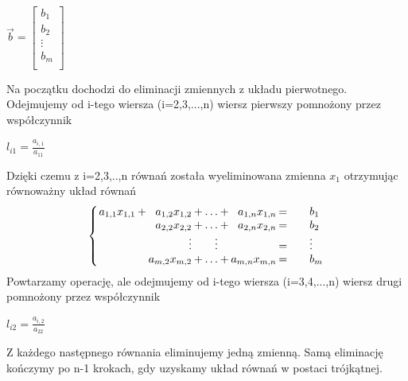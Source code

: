 \documentclass{article}
\begin{document}
\begin{center}
    \begin{math}
    \overrightarrow{b} =
    \left[
  \begin{matrix}
    b_{1}  \\
    b_{2}  \\
    \vdots   \\
    b_{m}  \\
  \end{matrix}
  \right]
    \end{math}
\end{center}
Na początku dochodzi do eliminacji zmiennych z układu pierwotnego. Odejmujemy od i-tego wiersza (i=2,3,...,n) wiersz
pierwszy pomnożony przez współczynnik
\begin{center}
    \begin{math}
        l_{i1} = \frac{a_{i,1}}{a_{11}}
    \end{math}
\end{center}
Dzięki czemu z  i=2,3,..,n równań została wyeliminowana zmienna \begin{math}x_{1} \end{math} otrzymując równoważny układ równań
\[
\setlength\arraycolsep{1pt}
\left\{
\begin{array}{rcrcrcrc@{\qquad}l}
a_{1,1}x_{1,1}  & +  &    a_{1,2}x_{1,2}    & + &   \ldots      & + &   a_{1,n}x_{1,n} &   =   &    b_{1} \\
                &    &   a_{2,2}x_{2,2}     & + &   \ldots      & + &   a_{2,n}x_{2,n} &   =   &    b_{2} \\
                &    &   \vdots             &   &   \vdots      &   &                  &   =   &    \vdots \\             
                &    &   a_{m,2}x_{m,2}     & + &   \ldots      & + &   a_{m,n}x_{m,n} &   =   &    b_{m} \\
\end{array}
\right.
\]
Powtarzamy operację, ale odejmujemy od i-tego
wiersza (i=3,4,...,n) wiersz drugi pomnożony przez
współczynnik
\begin{center}
    \begin{math}
        l_{i2} = \frac{a_{i,2}}{a_{22}}
    \end{math}
\end{center}
\newpage
Z każdego następnego równania eliminujemy jedną zmienną. Samą eliminację kończymy po n-1 krokach, gdy uzyskamy układ równań w postaci trójkątnej.
\end{document}
